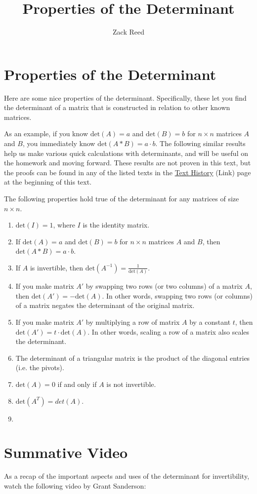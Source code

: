 \documentclass{ximera}
\author{Zack Reed}
\title{Properties of the Determinant}
\begin{document}
\begin{abstract}

\end{abstract}
\maketitle

\section*{Properties of the Determinant}

Here are some nice properties of the determinant. Specifically, these let you find the determinant of a matrix that is constructed in relation to other known matrices. 

As an example, if you know $\mbox{det}(A)=a$ and $\mbox{det}(B)=b$ for $n\times n$ matrices $A$ and $B$, you immediately know $\mbox{det}(A*B)=a\cdot b$. The following similar results help us make various quick calculations with determinants, and will be useful on the homework and moving forward. These results are not proven in this text, but the proofs can be found in any of the listed texts in the \href{https://ximera.osu.edu/appliedlinearalgebra/a1Copyright/learningActivities/m0Copyright/textHistory}{Text History} (Link) page at the beginning of this text.

\begin{theorem}
    The following properties hold true of the determinant for any matrices of size $n\times n$.
    \begin{enumerate}
        \item $\mbox{det}(I)=1$, where $I$ is the identity matrix.
        \item If $\mbox{det}(A)=a$ and $\mbox{det}(B)=b$ for $n\times n$ matrices $A$ and $B$, then $\mbox{det}(A*B)=a\cdot b$.
        \item If $A$ is invertible, then $\mbox{det}(A^{-1})=\frac{1}{\mbox{det}(A)}$.
        \item If you make matrix $A'$ by swapping two rows (or two columns) of a matrix $A$, then $\mbox{det}(A')=-\mbox{det}(A)$. In other words, swapping two rows (or columns) of a matrix negates the determinant of the original matrix. 
        \item If you make matrix $A'$ by multiplying a row of matrix $A$ by a constant $t$, then $\mbox{det}(A')=t\cdot \mbox{det}(A)$. In other words, scaling a row of a matrix also scales the determinant.
        \item The determinant of a triangular matrix is the product of the diagonal entries (i.e. the pivots).
        \item $\mbox{det}(A)=0$ if and only if $A$ is not invertible.
        \item $\mbox{det}(A^T)=det(A)$.
        \item 
    \end{enumerate}
\end{theorem}

\section*{Summative Video}

As a recap of the important aspects and uses of the determinant for invertibility, watch the following video by Grant Sanderson:

\begin{center}
\end{center}
\end{document}
